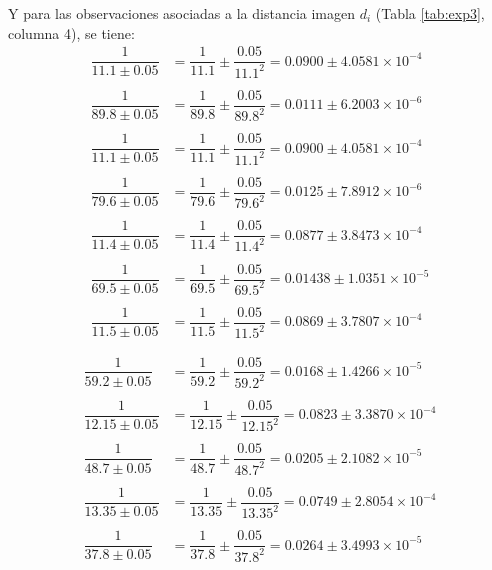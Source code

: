 \documentclass[10pt,a4paper]{article}
\begin{document}
	Y para las observaciones asociadas a la distancia imagen $d_i$ (Tabla \ref{tab:exp3}, columna 4), se tiene:
	\begin{align*}
		\dfrac{1}{11.1\pm 0.05}&=\dfrac{1}{11.1}\pm\dfrac{0.05}{11.1^2}=0.0900\pm4.0581\times10^{-4}\\\\
		\dfrac{1}{89.8\pm 0.05}&=\dfrac{1}{89.8}\pm\dfrac{0.05}{89.8^2}=0.0111\pm6.2003\times10^{-6}\\\\
		\dfrac{1}{11.1\pm 0.05}&=\dfrac{1}{11.1}\pm\dfrac{0.05}{11.1^2}=0.0900\pm4.0581\times10^{-4}\\\\
		\dfrac{1}{79.6\pm 0.05}&=\dfrac{1}{79.6}\pm\dfrac{0.05}{79.6^2}=0.0125\pm7.8912\times10^{-6}\\\\
		\dfrac{1}{11.4\pm 0.05}&=\dfrac{1}{11.4}\pm\dfrac{0.05}{11.4^2}=0.0877\pm3.8473\times10^{-4}\\\\
		\dfrac{1}{69.5\pm 0.05}&=\dfrac{1}{69.5}\pm\dfrac{0.05}{69.5^2}=0.01438\pm1.0351\times10^{-5}\\\\
		\dfrac{1}{11.5\pm 0.05}&=\dfrac{1}{11.5}\pm\dfrac{0.05}{11.5^2}=0.0869\pm3.7807\times10^{-4}\\\\
	\end{align*}
	\begin{align*}
		\dfrac{1}{59.2\pm 0.05}&=\dfrac{1}{59.2}\pm\dfrac{0.05}{59.2^2}=0.0168\pm1.4266\times10^{-5}\\\\
		\dfrac{1}{12.15\pm 0.05}&=\dfrac{1}{12.15}\pm\dfrac{0.05}{12.15^2}=0.0823\pm3.3870\times10^{-4}\\\\
		\dfrac{1}{48.7\pm 0.05}&=\dfrac{1}{48.7}\pm\dfrac{0.05}{48.7^2}=0.0205\pm2.1082\times10^{-5}\\\\
		\dfrac{1}{13.35\pm 0.05}&=\dfrac{1}{13.35}\pm\dfrac{0.05}{13.35^2}=0.0749\pm2.8054\times10^{-4}\\\\
		\dfrac{1}{37.8\pm 0.05}&=\dfrac{1}{37.8}\pm\dfrac{0.05}{37.8^2}=0.0264\pm3.4993\times10^{-5}\\\\
	\end{align*}
\end{document}
